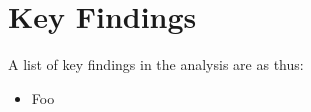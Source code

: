 \section{Key Findings}
\label{sec:key_findings}

A list of key findings in the analysis are as thus:


\begin{itemize}
  \item Foo
\end{itemize}